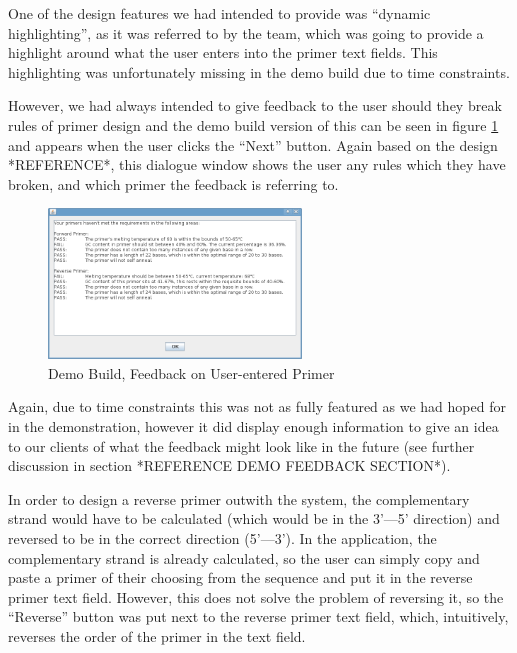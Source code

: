 One of the design features we had intended to provide was ``dynamic
highlighting'', as it was referred to by the team, which was going to
provide a highlight around what the user enters into the primer text
fields.
This highlighting was unfortunately missing in the demo build due to
time constraints.

However, we had always intended to give feedback to the user should
they break rules of primer design and the demo build version of this
can be seen in figure \ref{fig:demoBuild:primerFeedback} and appears
when the user clicks the ``Next'' button.
Again based on the design *REFERENCE*, this dialogue window shows the
user any rules which they have broken, and which primer the feedback
is referring to.

\begin{figure}[h]
  \begin{center}
    \includegraphics[width=0.6\textwidth]{./images/demoBuild/primerFeedback.png}
    \caption{
      \label{fig:demoBuild:primerFeedback}
      Demo Build, Feedback on User-entered Primer
    }
  \end{center}
\end{figure}

Again, due to time constraints this was not as fully featured as we
had hoped for in the demonstration, however it did display enough
information to give an idea to our clients of what the feedback might
look like in the future (see further discussion in section *REFERENCE
DEMO FEEDBACK SECTION*).

In order to design a reverse primer outwith the system, the
complementary strand would have to be calculated (which would be in
the 3'---5' direction) and reversed to be in the correct direction
(5'---3').
In the application, the complementary strand is already calculated, so
the user can simply copy and paste a primer of their choosing from the
sequence and put it in the reverse primer text field.
However, this does not solve the problem of reversing it, so the
``Reverse'' button was put next to the reverse primer text field,
which, intuitively, reverses the order of the primer in the text
field. 

